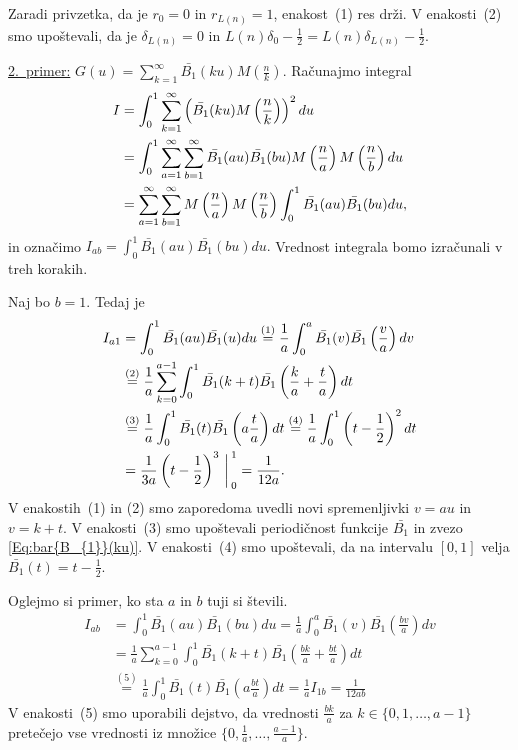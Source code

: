 \documentclass[mat1]{fmfdelo}
\begin{document}
Zaradi privzetka, da je $r_{0}=0$ in $r_{L(n)}=1$, enakost~(1) res drži.
V enakosti~(2) smo upoštevali, da je $\delta_{L(n)}=0$ in $L(n) \delta_{0}-\frac{1}{2} = L(n) \delta_{L(n)}-\frac{1}{2}.$

\underline{2.~primer:} $G(u) = \sum_{k=1}^{\infty} \bar{B_{1}}(ku) M \left(\frac{n}{k} \right)$.
Računajmo integral
\begin{align}
\label{Eq:I_{ab}}
I &= \int_{0}^1 \sum_{k=1}^{\infty} \left( \bar{B_{1}}(ku) M \left(\frac{n}{k} \right) \right)^2 du \nonumber \\
  &= \int_{0}^1 \sum_{a=1}^{\infty} \sum_{b=1}^{\infty} \bar{B_{1}}(au) \bar{B_{1}}(bu) M \left(\frac{n}{a} \right) M \left(\frac{n}{b} \right) du \nonumber \\
  &= \sum_{a=1}^{\infty} \sum_{b=1}^{\infty} M \left(\frac{n}{a} \right) M \left(\frac{n}{b} \right) \int_{0}^1 \bar{B_{1}}(au) \bar{B_{1}}(bu) du,
\end{align}
% 
in označimo $I_{ab} = \int_{0}^1 \bar{B_{1}}(au) \bar{B_{1}}(bu) du.$ Vrednost integrala bomo izračunali v treh korakih.

Naj bo $b=1$. Tedaj je
\begin{align}
I_{a1} &= \int_{0}^1 \bar{B_{1}}(au) \bar{B_{1}}(u) du
	\stackrel{(1)}{=} \frac{1}{a} \int_{0}^a \bar{B_{1}}(v) \bar{B_{1}} \left(\frac{v}{a} \right) dv \nonumber \\
	&\stackrel{(2)}{=} \frac{1}{a} \sum_{k=0}^{a-1} \int_{0}^1 \bar{B_{1}}(k+t) \bar{B_{1}} \left(\frac{k}{a}+\frac{t}{a} \right) dt \nonumber \\
	&\stackrel{(3)}{=} \frac{1}{a} \int_{0}^1 \bar{B_{1}}(t) \bar{B_{1}} \left(a\frac{t}{a} \right) dt
	\stackrel{(4)}{=} \frac{1}{a} \int_{0}^1 \left( t-\frac{1}{2} \right)^2 dt \nonumber \\
	&= \frac{1}{3a} \left( t-\frac{1}{2} \right)^3 \bigg \arrowvert_{0}^{1}
	= \frac{1}{12a}.
\end{align}
V enakostih~(1) in (2) smo zaporedoma uvedli novi spremenljivki $v=au$ in $v=k+t$. V enakosti~(3) smo upoštevali periodičnost funkcije $\bar{B_{1}}$ in zvezo \eqref{Eq:bar{B_{1}}(ku)}. V enakosti~(4) smo upoštevali, da na intervalu $[0,1]$ velja $\bar{B_{1}}(t) = t-\frac{1}{2}$.

Oglejmo si primer, ko sta $a$ in $b$ tuji si števili.
\begin{align}
I_{ab} &= \int_{0}^1 \bar{B_{1}}(au) \bar{B_{1}}(bu) du
	= \frac{1}{a} \int_{0}^a \bar{B_{1}}(v) \bar{B_{1}} \left(\frac{bv}{a} \right) dv \nonumber \\
	&= \frac{1}{a} \sum_{k=0}^{a-1} \int_{0}^1 \bar{B_{1}}(k+t) \bar{B_{1}} \left(\frac{bk}{a}+\frac{bt}{a} \right) dt \nonumber \\
	&\stackrel{(5)}{=} \frac{1}{a} \int_{0}^1 \bar{B_{1}}(t) \bar{B_{1}} \left(a\frac{bt}{a} \right) dt
	= \frac{1}{a} I_{1b} 
	= \frac{1}{12ab} 
\end{align}
V enakosti~(5) smo uporabili dejstvo, da vrednosti $\frac{bk}{a}$ za $k \in \{0,1, \dots, a-1 \}$ pretečejo vse vrednosti iz množice $\{0, \frac{1}{a}, \dots, \frac{a-1}{a}\}$.
\end{document}
